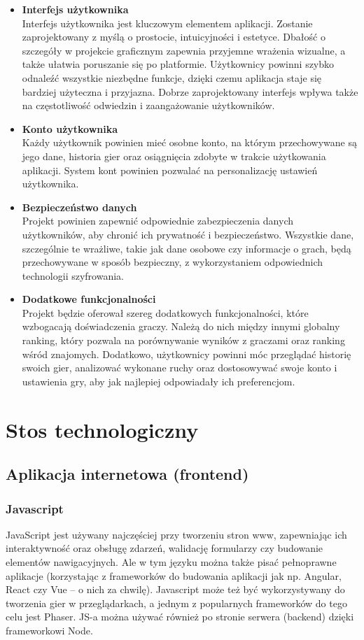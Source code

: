 \documentclass[12pt,a4paper]{article}
\begin{document}
\begin{itemize}
    \item \textbf{Interfejs użytkownika}\\
    Interfejs użytkownika jest kluczowym elementem aplikacji. Zostanie zaprojektowany z myślą o prostocie, intuicyjności i estetyce. Dbałość o szczegóły w projekcie graficznym zapewnia przyjemne wrażenia wizualne, a także ułatwia poruszanie się po platformie. Użytkownicy powinni szybko odnaleźć wszystkie niezbędne funkcje, dzięki czemu aplikacja staje się bardziej użyteczna i przyjazna. Dobrze zaprojektowany interfejs wpływa także na częstotliwość odwiedzin i zaangażowanie użytkowników.
    \item \textbf{Konto użytkownika}\\
    Każdy użytkownik powinien mieć osobne konto, na którym przechowywane są jego dane, historia gier oraz osiągnięcia zdobyte w trakcie użytkowania aplikacji. System kont powinien pozwalać na personalizację ustawień użytkownika.
    \item \textbf{Bezpieczeństwo danych}\\
    Projekt powinien zapewnić odpowiednie zabezpieczenia danych użytkowników, aby chronić ich prywatność i bezpieczeństwo. Wszystkie dane, szczególnie te wrażliwe, takie jak dane osobowe czy informacje o grach, będą przechowywane w sposób bezpieczny, z wykorzystaniem odpowiednich technologii szyfrowania.
    \item \textbf{Dodatkowe funkcjonalności}\\
    Projekt będzie oferował szereg dodatkowych funkcjonalności, które wzbogacają doświadczenia graczy. Należą do nich między innymi globalny ranking, który pozwala na porównywanie wyników z graczami oraz ranking wśród znajomych. Dodatkowo, użytkownicy powinni móc przeglądać historię swoich gier, analizować wykonane ruchy oraz dostosowywać swoje konto i ustawienia gry, aby jak najlepiej odpowiadały ich preferencjom.
\end{itemize}

\newpage

\section{Stos technologiczny}
\subsection{Aplikacja internetowa (frontend)}
\subsubsection{Javascript}
JavaScript jest używany najczęściej przy tworzeniu stron www, zapewniając ich interaktywność oraz obsługę zdarzeń, walidację formularzy czy budowanie elementów nawigacyjnych. Ale w tym języku można także pisać pełnoprawne aplikacje (korzystając z frameworków do budowania aplikacji jak np. Angular, React czy Vue – o nich za chwilę). Javascript może też być wykorzystywany do tworzenia gier w przeglądarkach, a jednym z popularnych frameworków do tego celu jest Phaser. JS-a można używać również po stronie serwera (backend) dzięki frameworkowi Node.
\end{document}
